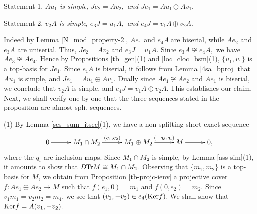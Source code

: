 \documentclass[10pt]{amsart}
\theoremstyle{definition}
\newcommand{\Ker}{{\rm Ker}}
\begin{document}
\vspace{1pt}

{\sc Statement 1.} {\it $Au_1$ is simple, $Je_2 = Av_2,$ and $Je_1=Au_1\oplus Av_1.$}

{\sc Statement 2.} {\it $v_2A$ is simple, $e_3J = u_1A,$ and $e_4J=v_1A\oplus v_2A.$}

Indeed by Lemma \ref{N_mod_property-2}, 
$Ae_1$ and $e_4A$ are biserial, while $Ae_2$ and $e_3A$ are uniserial. Thus, $Je_2=Av_2$ and $e_3J=u_1A.$ Since $e_3A\not\cong e_4A,$ we have $Ae_3\not\cong Ae_4.$ Hence by Propositions \ref{tb_gen}(1) and \ref{loc_cloc_bsm}(1), $\{u_1, v_1\}$ is a top-basis for $Je_1$. Since $e_4A$ is biserial, it follows from Lemma \ref{4sa_bproj} that $Au_1$ is simple, and $Je_1=Au_1\oplus Av_1$. Dually since $Ae_1\not\cong Ae_2$ and $Ae_1$ is biserial, we conclude that $v_2A$ is simple, and $e_4J=v_1A\oplus v_2A$. This establishes our claim. Next, we shall verify one by one that the three sequences stated in the proposition are almost split sequences.

(1) By Lemma \ref{ses_sum_itsec}(1), we have a non-splitting short exact sequence \vspace{-6pt} $$\xymatrixcolsep{28pt}\xymatrix{0\ar[r] & M_1\cap M_2 \ar[r]^-{(q_1, q_2)} & M_1\oplus M_2 \ar[r]^-{(-q_3, q_4)} & M \ar[r] & 0,}\vspace{-5.5pt}$$ where the $q_i$ are inclusion maps. Since $M_1\cap M_2$ is simple, by Lemma \ref{ass-sim}(1), it amounts to show that $D{\rm Tr}M\cong M_1\cap M_2$. \vspace{-.5pt} Observing that $\{m_1, m_2\}$ is a top-basis for $M$, we obtain from Proposition \ref{tb-projc-ienv} a projective cover $f: Ae_1\oplus Ae_2\to M$ such that $f(e_1, 0)=m_1$ and $f(0, e_2)=m_2.$ Since $v_1m_1=v_2m_2=m_4$, we see that $(v_1, -v_2)\in e_4 (\Ker f).$ 
We shall show that $\Ker f=A(v_1, -v_2).$ 
\end{document}
